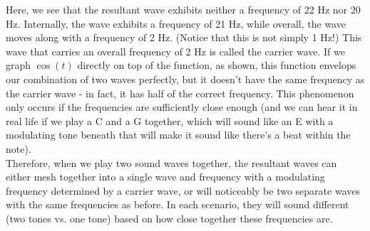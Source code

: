 Here, we see that the resultant wave exhibits neither a frequency of 22 Hz nor 20 Hz. Internally, the wave exhibits a frequency of 21 Hz, while overall, the wave moves along with a frequency of 2 Hz. (Notice that this is not simply 1 Hz!) This wave that carries an overall frequency of 2 Hz is called the carrier wave. If we graph $\cos(t)$ directly on top of the function, as shown, this function envelops our combination of two waves perfectly, but it doesn't have the same frequency as the carrier wave - in fact, it has half of the correct frequency. This phenomenon only occurs if the frequencies are sufficiently close enough (and we can hear it in real life if we play a C and a G together, which will sound like an E with a modulating tone beneath that will make it sound like there's a beat within the note). \\
Therefore, when we play two sound waves together, the resultant waves can either mesh together into a single wave and frequency with a modulating frequency determined by a carrier wave, or will noticeably be two separate waves with the same frequencies as before. In each scenario, they will sound different (two tones vs. one tone) based on how close together these frequencies are. 
